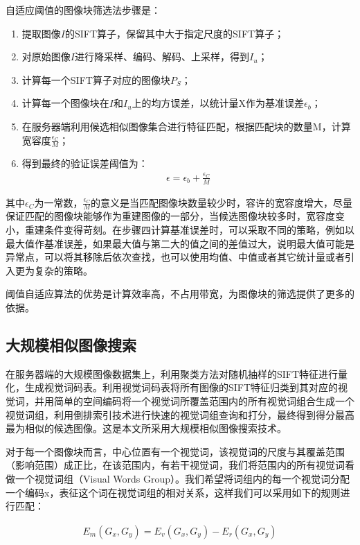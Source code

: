 \documentclass[UTF8]{csoarticle}
\begin{document}
自适应阈值的图像块筛选法步骤是：
\begin{enumerate}
\item 提取图像\(I\)的SIFT算子，保留其中大于指定尺度的SIFT算子；
\item 对原始图像\(I\)进行降采样、编码、解码、上采样，得到\(I_u\)；
\item 计算每一个SIFT算子对应的图像块\(P_S\)；
\item 计算每一个图像块在\(I\)和\(I_u\)上的均方误差，以统计量X作为基准误差\(\epsilon_b\)；
\item 在服务器端利用候选相似图像集合进行特征匹配，根据匹配块的数量M，计算宽容度\(\frac{\epsilon_C}{M}\)；
\item 得到最终的验证误差阈值为：
\begin{align}
\epsilon = \epsilon_b + \frac{\epsilon_C}{M}
\end{align}
\end{enumerate}

其中\(\epsilon_C\)为一常数，\(\frac{\epsilon_C}{M}\)的意义是当匹配图像块数量较少时，容许的宽容度增大，尽量保证匹配的图像块能够作为重建图像的一部分，当候选图像块较多时，宽容度变小，重建条件变得苛刻。在步骤四计算基准误差时，可以采取不同的策略，例如以最大值作基准误差，如果最大值与第二大的值之间的差值过大，说明最大值可能是异常点，可以将其移除后依次查找，也可以使用均值、中值或者其它统计量或者引入更为复杂的策略。

阈值自适应算法的优势是计算效率高，不占用带宽，为图像块的筛选提供了更多的依据。

\subsection{大规模相似图像搜索}

在服务器端的大规模图像数据集上，利用聚类方法对随机抽样的SIFT特征进行量化，生成视觉词码表。利用视觉词码表将所有图像的SIFT特征归类到其对应的视觉词，并用简单的空间编码将一个视觉词所覆盖范围内的所有视觉词组合生成一个视觉词组，利用倒排索引技术进行快速的视觉词组查询和打分，最终得到得分最高最为相似的候选图像。这是本文所采用大规模相似图像搜索技术。

对于每一个图像块而言，中心位置有一个视觉词，该视觉词的尺度与其覆盖范围（影响范围）成正比，在该范围内，有若干视觉词，我们将范围内的所有视觉词看做一个视觉词组（Visual Words Group）。我们希望将词组内的每一个视觉词分配一个编码x，表征这个词在视觉词组的相对关系，这样我们可以采用如下的规则进行匹配：

\begin{align}
\label{eq:rate}
E_m(G_x,G_y) = E_v(G_x,G_y) - E_r(G_x,G_y)
\end{align}
\end{document}
